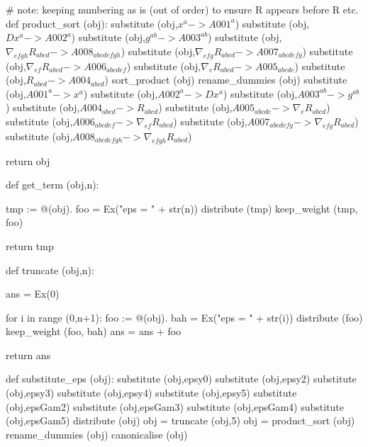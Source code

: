 \documentclass[12pt]{cdblatex}
\begin{document}
\begin{cadabra}
   # note: keeping numbering as is (out of order) to ensure R appears before \nabla R etc.
   def product_sort (obj):
       substitute (obj,$ x^{a}                            -> A001^{a}               $)
       substitute (obj,$ Dx^{a}                           -> A002^{a}               $)
       substitute (obj,$ g^{a b}                          -> A003^{a b}             $)
       substitute (obj,$ \nabla_{e f g h}{R_{a b c d}}    -> A008_{a b c d e f g h} $)
       substitute (obj,$ \nabla_{e f g}{R_{a b c d}}      -> A007_{a b c d e f g}   $)
       substitute (obj,$ \nabla_{e f}{R_{a b c d}}        -> A006_{a b c d e f}     $)
       substitute (obj,$ \nabla_{e}{R_{a b c d}}          -> A005_{a b c d e}       $)
       substitute (obj,$ R_{a b c d}                      -> A004_{a b c d}         $)
       sort_product   (obj)
       rename_dummies (obj)
       substitute (obj,$ A001^{a}                  -> x^{a}                         $)
       substitute (obj,$ A002^{a}                  -> Dx^{a}                        $)
       substitute (obj,$ A003^{a b}                -> g^{a b}                       $)
       substitute (obj,$ A004_{a b c d}            -> R_{a b c d}                   $)
       substitute (obj,$ A005_{a b c d e}          -> \nabla_{e}{R_{a b c d}}       $)
       substitute (obj,$ A006_{a b c d e f}        -> \nabla_{e f}{R_{a b c d}}     $)
       substitute (obj,$ A007_{a b c d e f g}      -> \nabla_{e f g}{R_{a b c d}}   $)
       substitute (obj,$ A008_{a b c d e f g h}    -> \nabla_{e f g h}{R_{a b c d}} $)

       return obj

   def get_term (obj,n):

       tmp := @(obj).
       foo = Ex("eps = " + str(n))
       distribute  (tmp)
       keep_weight (tmp, foo)

       return tmp

   def truncate (obj,n):

       ans = Ex(0)

       for i in range (0,n+1):
          foo := @(obj).
          bah = Ex("eps = " + str(i))
          distribute  (foo)
          keep_weight (foo, bah)
          ans = ans + foo

       return ans

   def substitute_eps (obj):
       substitute     (obj,epsy0)
       substitute     (obj,epsy2)
       substitute     (obj,epsy3)
       substitute     (obj,epsy4)
       substitute     (obj,epsy5)
       substitute     (obj,epsGam2)
       substitute     (obj,epsGam3)
       substitute     (obj,epsGam4)
       substitute     (obj,epsGam5)
       distribute     (obj)
       obj = truncate     (obj,5)
       obj = product_sort (obj)
       rename_dummies (obj)
       canonicalise   (obj)


\end{cadabra}
\end{document}
